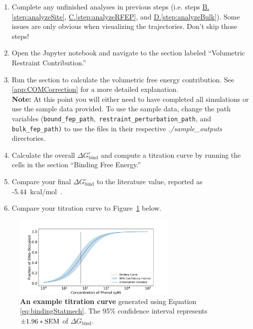 \documentclass[9pt,tutorial,pubversion]{Styling/livecoms}
\newcommand{\filepath}[1]{\textit{#1}}
\newcommand{\textInput}[1]{\texttt{#1}}
\begin{document}
    \begin{enumerate}
    \item Complete any unfinished analyses in previous steps (i.e. steps \hyperref[step:analyzeSite]{B.\ref{step:analyzeSite}}, \hyperref[step:analyzeRFEP]{C.\ref{step:analyzeRFEP}}, and \hyperref[step:analyzeBulk]{D.\ref{step:analyzeBulk}}).
    Some issues are only obvious when visualizing the trajectories. Don't skip those steps!
    \item Open the Jupyter notebook and navigate to the section labeled ``Volumetric Restraint Contribution.''
    \item Run the section to calculate the volumetric free energy contribution.\label{step:dGV}
    See \ref{app:COMCorrection} for a more detailed explanation.\\
    \textbf{Note:} At this point you will either need to have completed all simulations or use the sample data provided. To use the sample data, change the path variables (\textInput{bound\_fep\_path},\textInput{ restraint\_perturbation\_path}, and \textInput{bulk\_fep\_path\textrm{)}} to use the files in their respective \filepath{./sample\_outputs} directories. 
    \item Calculate the overall $\Delta G_\mathrm{bind}^\circ$ and compute a titration curve by running the cells in the section ``Binding Free Energy.''
    \item Compare your final $\Delta G_\mathrm{bind}^\circ$ to the literature value, reported as -5.44~kcal/mol~\cite{Merski2013}.
    \item Compare your titration curve to Figure~\ref{fig:titrationCurve} below.
\end{enumerate}

\begin{figure}[!htb]
    \centering
    \includegraphics[width=0.7\textwidth]{titration_curve}
    \caption{\textbf{An example titration curve} generated using Equation \ref{eq:bindingStatmech}. The 95\% confidence interval represents $\pm 1.96*\rm SEM$ of $\Delta G_\mathrm{bind}$.}
    \label{fig:titrationCurve}  
\end{figure}
\end{document}
